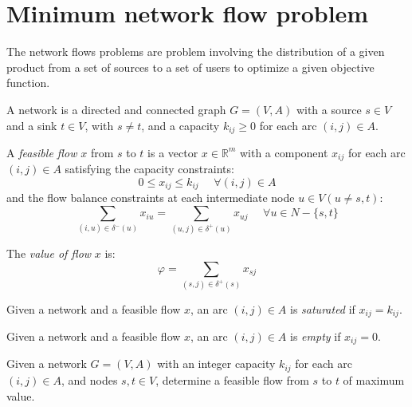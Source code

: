 \documentclass[12pt, a4paper]{report}
\newtheorem[style=M,bodystyle=\normalfont]{proposition}{Proposition}
\newtheorem[style=M,bodystyle=\normalfont]{theorem}{Theorem}
\newtheorem[style=M,bodystyle=\normalfont]{corollary}{Corollary}
\newtheorem[style=M,bodystyle=\normalfont]{lemma}{Lemma}
\newtheorem[style=M,bodystyle=\normalfont]{definition}{Definition}
\begin{document}
    \section{Minimum network flow problem}
    The network flows problems are problem involving the distribution of a given product from a set of sources to a set of users to optimize a given objective function. 
    \begin{definition}
        A network is a directed and connected graph $G = (V,A)$ with a source $s \in V$ and a sink $t \in V$, with $s \neq t$, and a capacity $k_{ij} \geq 0$ for each arc 
        $(i,j) \in A$. 

        A \emph{feasible flow} $x$ from $s$ to $t$ is a vector $x \in \mathbb{R}^m$ with a component $x_{ij}$ for each arc $(i,j) \in A$ satisfying the capacity constraints:
        \[0 \leq x_{ij} \leq k_{ij} \:\:\:\:\:\: \forall (i,j) \in A\]
        and the flow balance constraints at each intermediate node $u \in V (u \neq s,t)$: 
        \[\sum_{(i,u)\in \delta^{-}(u)}x_{iu}=\sum_{(u,j)\in \delta^{+}(u)}x_{uj} \:\:\:\:\:\: \forall u \in N-\{s,t\}\]

        The \emph{value of flow} $x$ is:
        \[\varphi = \sum_{(s,j) \in \delta^{+}(s)} x_{sj}\]

        Given a network and a feasible flow $x$, an arc $(i,j) \in A$ is \emph{saturated} if $x_{ij} = k_{ij}$. 

        Given a network and a feasible flow $x$, an arc $(i,j) \in A$ is \emph{empty} if $x_{ij} = 0$. 
    \end{definition}
    Given a network $G = (V,A)$ with an integer capacity $k_{ij}$ for each arc $(i,j) \in A$, and nodes $s,t \in V$, determine a feasible flow from $s$ to $t$ of maximum value. 
\end{document}
